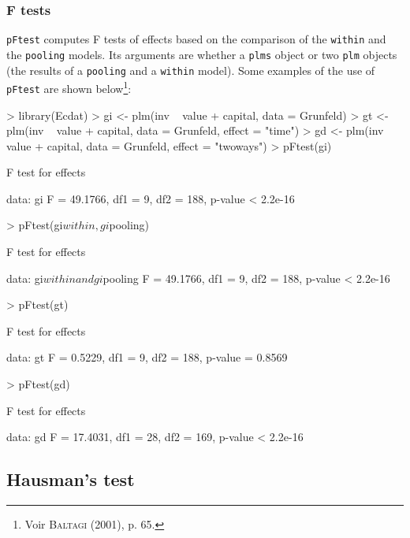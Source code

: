 \documentclass{article}
\begin{document}
\subsubsection{F tests}

\texttt{pFtest} computes F tests of effects based on the comparison of
the  \texttt{within} and the \texttt{pooling} models. Its arguments
are whether a \texttt{plms} object or two \texttt{plm} objects
(the results of a  \texttt{pooling} and a \texttt{within} model).
Some examples of the use of \texttt{pFtest} are shown below\footnote{Voir \textsc{Baltagi} (2001),
  p. 65.}:

\begin{Schunk}
\begin{Sinput}
> library(Ecdat)
> gi <- plm(inv ~ value + capital, data = Grunfeld)
> gt <- plm(inv ~ value + capital, data = Grunfeld, effect = "time")
> gd <- plm(inv ~ value + capital, data = Grunfeld, effect = "twoways")
> pFtest(gi)
\end{Sinput}
\begin{Soutput}
	F test for effects

data:  gi 
F = 49.1766, df1 = 9, df2 = 188, p-value < 2.2e-16
\end{Soutput}
\begin{Sinput}
> pFtest(gi$within, gi$pooling)
\end{Sinput}
\begin{Soutput}
	F test for effects

data:  gi$within and gi$pooling 
F = 49.1766, df1 = 9, df2 = 188, p-value < 2.2e-16
\end{Soutput}
\begin{Sinput}
> pFtest(gt)
\end{Sinput}
\begin{Soutput}
	F test for effects

data:  gt 
F = 0.5229, df1 = 9, df2 = 188, p-value = 0.8569
\end{Soutput}
\begin{Sinput}
> pFtest(gd)
\end{Sinput}
\begin{Soutput}
	F test for effects

data:  gd 
F = 17.4031, df1 = 28, df2 = 169, p-value < 2.2e-16
\end{Soutput}
\end{Schunk}



\subsection{Hausman's test}
\end{document}
